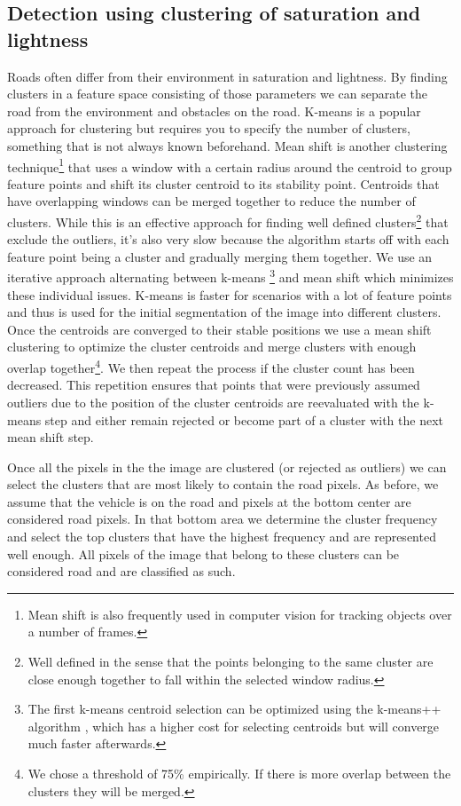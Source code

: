 \documentclass[oneside,english]{llncs}
\begin{document}
\subsection{Detection using clustering of saturation and lightness}

Roads often differ from their environment in saturation and lightness. By finding clusters in a feature space consisting of those parameters we can separate the road from the environment and obstacles on the road. K-means is a popular approach for clustering but requires you to specify the number of clusters, something that is not always known beforehand. Mean shift\cite{key-7} is another clustering technique\footnote{Mean shift is also frequently used in computer vision for tracking objects over a number of frames.}
that uses a window with a certain radius around the centroid to group feature points and shift its cluster centroid to its stability point. Centroids that have overlapping windows can be merged together to reduce the number of clusters. While this is an effective approach for finding well defined clusters\footnote{Well defined in the sense that the points belonging to the same cluster are close enough together to fall within the selected window radius.} that exclude the outliers, it's also very slow because the algorithm starts off with each feature point being a cluster and gradually merging them together. We use an iterative approach alternating between k-means
\footnote{The first k-means centroid selection can be optimized using the k-means++ algorithm \cite{key-8}, which has a higher cost for selecting centroids but will converge much faster afterwards.} 
and mean shift which minimizes these individual issues. K-means is faster for scenarios with a lot of feature points and thus is used for the initial segmentation of the image into different clusters. Once the centroids are converged to their stable positions we use a mean shift clustering to optimize the cluster centroids and merge clusters with enough overlap together\footnote{We chose a threshold of 75\% empirically. If there is more overlap between the clusters they will be merged.}. We then repeat the process if the cluster count has been decreased. This repetition ensures that points that were previously assumed outliers due to the position of the cluster centroids are reevaluated with the k-means step and either remain rejected or become part of a cluster with the next mean shift step.

Once all the pixels in the the image are clustered (or rejected as outliers) we can select the clusters that are most likely to contain the road pixels. As before, we assume that the vehicle is on the road and pixels at the bottom center are considered road pixels. In that bottom area we determine the cluster frequency and select the top clusters that have the highest frequency and are represented well enough. All pixels of the image that belong to these clusters can be considered road and are classified as such.
\end{document}
